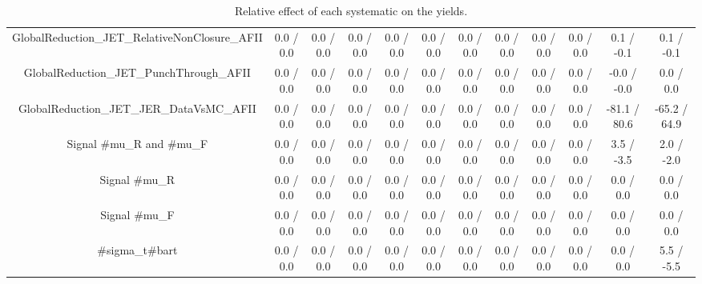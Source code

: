\begin{table}[htbp]
\begin{center}
\begin{tabular}{|c|c|c|c|c|c|c|c|c|c|c|c|}
  GlobalReduction_JET_RelativeNonClosure_AFII & 0.0 / 0.0 & 0.0 / 0.0 & 0.0 / 0.0 & 0.0 / 0.0 & 0.0 / 0.0 & 0.0 / 0.0 & 0.0 / 0.0 & 0.0 / 0.0 & 0.0 / 0.0 & 0.1 / -0.1 & 0.1 / -0.1 \\ 
  GlobalReduction_JET_PunchThrough_AFII & 0.0 / 0.0 & 0.0 / 0.0 & 0.0 / 0.0 & 0.0 / 0.0 & 0.0 / 0.0 & 0.0 / 0.0 & 0.0 / 0.0 & 0.0 / 0.0 & 0.0 / 0.0 & -0.0 / -0.0 & 0.0 / 0.0 \\ 
  GlobalReduction_JET_JER_DataVsMC_AFII & 0.0 / 0.0 & 0.0 / 0.0 & 0.0 / 0.0 & 0.0 / 0.0 & 0.0 / 0.0 & 0.0 / 0.0 & 0.0 / 0.0 & 0.0 / 0.0 & 0.0 / 0.0 & -81.1 / 80.6 & -65.2 / 64.9 \\ 
  Signal #mu_{R} and #mu_{F} & 0.0 / 0.0 & 0.0 / 0.0 & 0.0 / 0.0 & 0.0 / 0.0 & 0.0 / 0.0 & 0.0 / 0.0 & 0.0 / 0.0 & 0.0 / 0.0 & 0.0 / 0.0 & 3.5 / -3.5 & 2.0 / -2.0 \\ 
  Signal #mu_{R} & 0.0 / 0.0 & 0.0 / 0.0 & 0.0 / 0.0 & 0.0 / 0.0 & 0.0 / 0.0 & 0.0 / 0.0 & 0.0 / 0.0 & 0.0 / 0.0 & 0.0 / 0.0 & 0.0 / 0.0 & 0.0 / 0.0 \\ 
  Signal #mu_{F} & 0.0 / 0.0 & 0.0 / 0.0 & 0.0 / 0.0 & 0.0 / 0.0 & 0.0 / 0.0 & 0.0 / 0.0 & 0.0 / 0.0 & 0.0 / 0.0 & 0.0 / 0.0 & 0.0 / 0.0 & 0.0 / 0.0 \\ 
  #sigma_{t#bar{t}} & 0.0 / 0.0 & 0.0 / 0.0 & 0.0 / 0.0 & 0.0 / 0.0 & 0.0 / 0.0 & 0.0 / 0.0 & 0.0 / 0.0 & 0.0 / 0.0 & 0.0 / 0.0 & 0.0 / 0.0 & 5.5 / -5.5 \\ 
\hline 
\end{tabular} 
\caption{Relative effect of each systematic on the yields.} 
\end{center} 
\end{table} 
